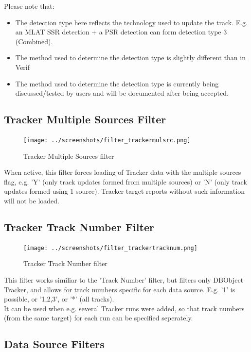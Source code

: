 Please note that:
\begin{itemize}
 \item The detection type here reflects the technology used to update the track. E.g. an MLAT SSR detection + a PSR detection can form detection type 3 (Combined).
 \item The method used to determine the detection type is slightly different than in Verif
 \item The method used to determine the detection type is currently being discussed/tested by users and will be documented after being accepted.
\end{itemize}

\subsection{Tracker Multiple Sources Filter}

\begin{figure}[H]
  \center
    \texttt{[image: ../screenshots/filter\_trackermulsrc.png]}
  \caption{Tracker Multiple Sources filter}
\end{figure}

When active, this filter forces loading of Tracker data with the multiple sources flag, e.g. 'Y' (only track updates formed from multiple sources) or 'N' (only track updates formed using 1 source). Tracker target reports without such information will not be loaded.

\subsection{Tracker Track Number Filter}

\begin{figure}[H]
  \center
    \texttt{[image: ../screenshots/filter\_trackertracknum.png]}
  \caption{Tracker Track Number filter}
\end{figure}

This filter works similiar to the 'Track Number' filter, but filters only DBObject Tracker, and allows for track numbers specific for each data source. E.g. '1' is possible, or '1,2,3', or '*' (all tracks).\\

It can be used when e.g. several Tracker runs were added, so that track numbers (from the same target) for each run can be specified seperately. \\

\subsection{Data Source Filters}

